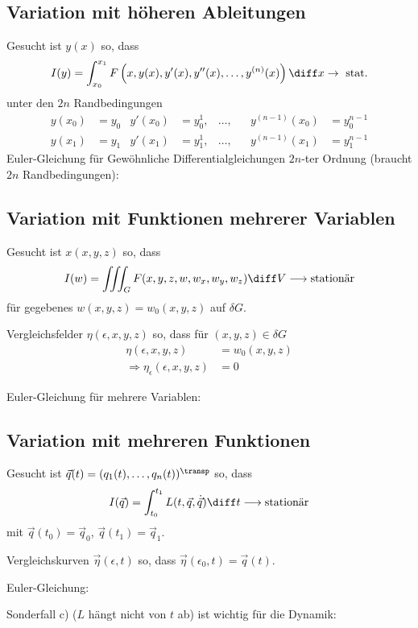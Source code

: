 	\subsection{Variation mit höheren Ableitungen} %
		Gesucht ist $y(x)$ so, dass
		\[
			I(y) = \int_{x_0}^{x_1} F \left( x, y(x), y'(x),y''(x), \ldots, y^{(n)}(x) \right) \diff x \rightarrow \text{ stat.}
		\]
		unter den $2n$ Randbedingungen
		\begin{align*}
		 y(x_0) &= y_0 & y'(x_0) &= y_0^1, &\ldots,& &y^{(n-1)}(x_0) &= y_0^{n-1} \\
		 y(x_1) &= y_1 & y'(x_1) &= y_1^1, &\ldots,& &y^{(n-1)}(x_1) &= y_1^{n-1} 
		\end{align*}
		Euler-Gleichung für Gewöhnliche Differentialgleichungen $2n$-ter Ordnung (braucht $2n$ Randbedingungen):
	
	\subsection{Variation mit Funktionen mehrerer Variablen} %
		Gesucht ist $x(x,y,z)$ so, dass
		\[
			I(w) = \iiint_G F(x,y,z,w,w_x,w_y,w_z) \diff V \longrightarrow \text{stationär}
		\]
		für gegebenes $w(x,y,z) = w_0(x,y,z)$ auf $\delta G$.
		
		Vergleichsfelder $\eta(\epsilon,x,y,z)$ so, dass für $(x,y,z) \in \delta G$
		\begin{align*}
			\eta(\epsilon,x,y,z) &= w_0(x,y,z) \\
			\Rightarrow \eta_\epsilon(\epsilon,x,y,z) &= 0
		\end{align*}
		
		Euler-Gleichung für mehrere Variablen:
	
	\subsection{Variation mit mehreren Funktionen} %
		Gesucht ist $\vec q(t) = (q_1(t),\dots,q_n(t))^\transp$ so, dass
		\[
			I(\vec q) = \int_{t_0}^{t_1} L(t,\vec q, \dot{\vec q}) \diff t \longrightarrow \text{stationär}
		\]
		mit $\vec q(t_0) = \vec q_0$, $\vec q(t_1) = \vec q_1$.
		
		Vergleichskurven $\vec \eta(\epsilon,t)$ so, dass $\vec \eta(\epsilon_0, t) = \vec q(t)$.
		
		Euler-Gleichung:
		
		Sonderfall c) ($L$ hängt nicht von $t$ ab) ist wichtig für die Dynamik:
